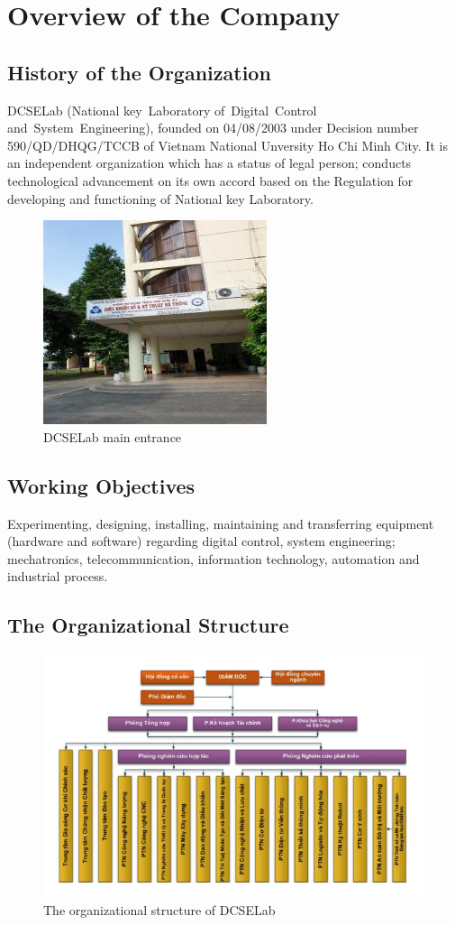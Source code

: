 \chapter{Overview of the Company}
\section{History of the Organization }
DCSELab (National key Laboratory of Digital Control and System Engineering), founded on 04/08/2003 under Decision number 590/QD/DHQG/TCCB of Vietnam National Unversity Ho Chi Minh City. It is an independent organization which has a status of legal person; conducts technological advancement on its own accord based on the Regulation for developing and functioning of National key Laboratory.
\begin{figure}[h]
	\centering
	\includegraphics[width=0.6\linewidth]{01}
	\caption{DCSELab main entrance}
	\label{fig:01}
\end{figure}
\section{Working Objectives}
Experimenting, designing, installing, maintaining and transferring equipment (hardware and software) regarding digital control, system engineering; mechatronics, telecommunication, information technology, automation and industrial process.
\section{The Organizational Structure}
\begin{figure}[ht]
	\centering
	\includegraphics[width=0.7\linewidth]{02}
	\caption{The organizational structure of DCSELab}
	\label{fig:02}
\end{figure}
